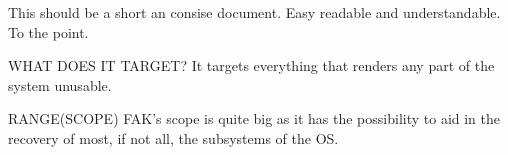 This should be a short an consise document.  Easy readable and understandable.  To the point.



WHAT DOES IT TARGET?
It targets everything that renders any part of the system unusable.

RANGE(SCOPE)
FAK's scope is quite big as it has the possibility to aid in the recovery of most, if not all, the subsystems of the OS.
